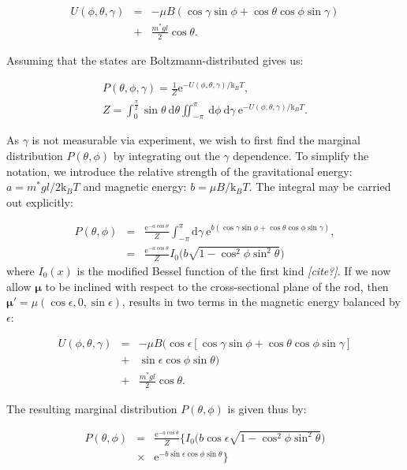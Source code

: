 \documentclass[aps,prl,twocolumn,superscriptaddress]{revtex4-1}
\newcommand{\vc}[1]{\boldsymbol{#1}}
\newcommand{\ssc}[0]{\sin{\gamma}}
\newcommand{\ccc}[0]{\cos{\gamma}}
\newcommand{\sst}[0]{\sin{\theta}}
\newcommand{\cct}[0]{\cos{\theta}}
\newcommand{\ssp}[0]{\sin{\phi}}
\newcommand{\ccp}[0]{\cos{\phi}}
\newcommand{\dd}{\mathrm{d}}
\newcommand{\ee}{\mathrm{e}}
\newcommand{\kk}{\mathrm{k}_B}
\begin{document}
\begin{eqnarray}
U(\phi,\theta,\gamma) & = & -\mu B (\ccc\ssp + \cct\ccp\ssc) \nonumber \\
&  + & \frac{m^*gl}{2} \cct.
\end{eqnarray}

Assuming that the states are Boltzmann-distributed gives us:

\begin{eqnarray}
P(\theta, \phi, \gamma)  =  \frac{1}{Z} \ee^{ -U(\phi, \theta, \gamma)/\kk T }, \\
Z  =  \int_0^{\frac{\pi}{2}} \sst\ \dd\theta \iint_{-\pi}^{\pi}\ \dd\phi\ \dd\gamma \ \ee^{ -U(\phi, \theta, \gamma)/\kk T }.
\end{eqnarray}

As $\gamma$ is not measurable via experiment, we wish to first find the marginal distribution $P(\theta,\phi)$ by integrating out the $\gamma$ dependence. To simplify the notation, we introduce the relative strength of the gravitational energy: $a=m^*gl/2 \kk T$ and magnetic energy: $b=\mu B/\kk T$. The integral may be carried out explicitly:

\begin{eqnarray}
P(\theta,\phi)  & = & \frac{\ee^{-a\cos\theta}}{Z} \int_{-\pi}^{\pi}  \dd\gamma \  \ee^{b(\ccc\ssp + \cct\ccp\ssc) }, \nonumber \\
           & = & \frac{\ee^{-a\cos\theta}}{Z}  I_0\Big( b\sqrt{1-\cos^2\phi\sin^2\theta} \Big) \label{P}
\end{eqnarray}where $I_0(x)$ is the modified Bessel function of the first kind \emph{[cite?]}. If we now allow $\vc{\mu}$ to be inclined with respect to the cross-sectional plane of the rod, then $\vc{\mu}'=\mu(\cos\epsilon,0,\sin\epsilon)$, results in two terms in the magnetic energy balanced by $\epsilon$:

\begin{eqnarray}
U(\phi,\theta,\gamma) & = & -\mu B \Big( \cos\epsilon [\ccc\ssp + \cct\ccp\ssc] \nonumber \\
& + & \sin\epsilon \cos\phi\sin\theta \Big) \nonumber \\
&  + & \frac{m^*gl}{2} \cct.
\end{eqnarray}

The resulting marginal distribution $P(\theta,\phi)$ is given thus by:

\begin{eqnarray}
P(\theta,\phi)  & = & \frac{\ee^{-a\cos\theta}}{Z} \Big\{ I_0\Big( b\cos\epsilon\sqrt{1-\cos^2\phi\sin^2\theta} \Big) \nonumber\\
& \times &  \ee^{-b \sin\epsilon \cos\phi\sin\theta}\Big\} \label{P_corrected}
\end{eqnarray}
\end{document}
